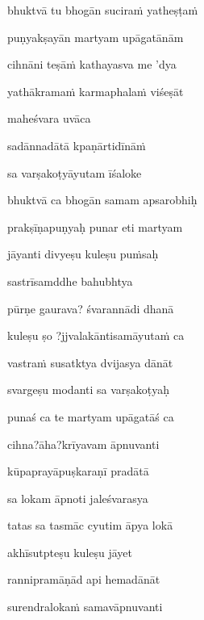 \nemsloka 
bhuktvā tu bhogān sucira\.m yatheṣṭa\.m
\dontdisplaylinenum

\nemslokab 
puṇyakṣayān martyam upāgatānām \danda\dontdisplaylinenum

\nemslokac 
cihnāni teṣā\.m kathayasva me 'dya
\dontdisplaylinenum

\nemslokad 
yathākrama\.m karmaphala\.m viśeṣāt \veg\dontdisplaylinenum

\vers

maheśvara uvāca~{\dandab}\dontdisplaylinenum 

\nemsloka 
sadānnadātā kpaṇārtidīnā\.m
\dontdisplaylinenum

\nemslokab 
sa varṣakoṭyāyutam īśaloke \danda\dontdisplaylinenum

\nemslokac 
bhuktvā ca bhogān samam apsarobhiḥ
\dontdisplaylinenum

\nemslokad 
prakṣīṇapuṇyaḥ punar eti martyam \veg\dontdisplaylinenum

\ujvers\nemsloka 
jāyanti divyeṣu kuleṣu pu\.msaḥ
\dontdisplaylinenum

\nemslokab 
sastrīsamddhe bahubhtya \danda\dontdisplaylinenum

\nemslokac 
pūrṇe gaurava? śvarannādi dhanā
\dontdisplaylinenum

\nemslokad 
kuleṣu ṣo ?jjvalakāntisamāyuta\.m ca \veg\dontdisplaylinenum 

\ujvers\nemsloka 
vastra\.m susatktya dvijasya dānāt
\dontdisplaylinenum

\nemslokab 
svargeṣu modanti sa varṣakoṭyaḥ \danda\dontdisplaylinenum

\nemslokac 
punaś ca te martyam upāgatāś ca
\dontdisplaylinenum

\nemslokad 
cihna?āha?krīyavam āpnuvanti \veg\dontdisplaylinenum

\ujvers\nemsloka 
kūpaprayāpuṣkaraṇī pradātā
\dontdisplaylinenum

\nemslokab 
sa lokam āpnoti jaleśvarasya \danda\dontdisplaylinenum

\nemslokac 
tatas sa tasmāc cyutim āpya lokā
\dontdisplaylinenum

\nemslokad 
akhīsutpteṣu kuleṣu jāyet \veg\dontdisplaylinenum

\ujvers\nemsloka 
rannipramāṇād api hemadānāt
\dontdisplaylinenum

\nemslokab 
surendraloka\.m samavāpnuvanti \danda\dontdisplaylinenum

